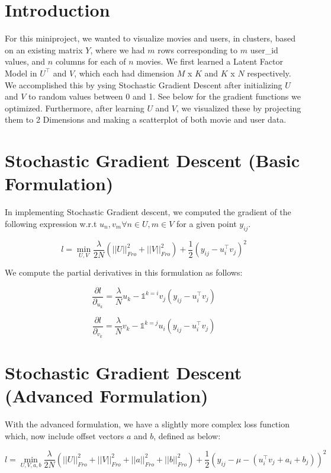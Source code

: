 \documentclass{article}
\begin{document}
\section*{Introduction}

For this miniproject, we wanted to visualize movies and users, in clusters,
based on an existing matrix $Y$, where we had $m$ rows corresponding to $m$
user\_id values, and $n$ columns for each of $n$ movies. We first learned
a Latent Factor Model in $U^{\intercal}$ and $V$, which each had dimension
$M$ x $K$ and $K$ x $N$ respectively. We accomplished this by ysing Stochastic
Gradient Descent after initializing $U$ and $V$ to random values between 0 and 1.
See below for the gradient functions we optimized. Furthermore, after learning
$U$ and $V$, we visualized these by projecting them to 2 Dimensions and making
a scatterplot of both movie and user data.


\section*{Stochastic Gradient Descent (Basic Formulation)}

In implementing Stochastic Gradient descent, we computed the gradient
of the following expression w.r.t $u_{n}, v_{m} \forall n \in U, m \in V$
for a given point $y_{ij}$.

$$ l = \min_{U, V} \frac{\lambda}{2N} (||U||^{2}_{Fro} + ||V||^{2}_{Fro}) +
\frac{1}{2}(y_{ij} - u_{i}^{\intercal}v_{j})^{2} $$

We compute the partial derivatives in this formulation as follows:

$$ \frac{\partial l}{\partial_{u_{k}}} = \frac{\lambda}{N} u_{k} - \mathds{1}^{k = i} v_{j}(y_{ij} - u_{i}^{\intercal}v_{j}) $$


$$ \frac{\partial l}{\partial_{v_{k}}} = \frac{\lambda}{N} v_{k} - \mathds{1}^{k = j} u_{i}(y_{ij} - u_{i}^{\intercal}v_{j}) $$




\section*{Stochastic Gradient Descent (Advanced Formulation)}

With the advanced formulation, we have a slightly more complex loss function which,
now include offset vectors $a$ and $b$, defined as below:

$$ l =  \min_{U, V, a, b} \frac{\lambda}{2N} (||U||^{2}_{Fro} + ||V||^{2}_{Fro}
+ ||a||^{2}_{Fro} + ||b||^{2}_{Fro}) + \frac{1}{2} (y_{ij} - \mu - (u_{i}^{\intercal}v_{j} + a_{i} + b_{j}))^{2} $$
\end{document}
